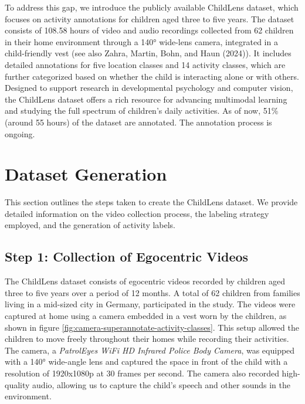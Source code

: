 \documentclass[
  man,floatsintext]{apa6}
\begin{document}
To address this gap, we introduce the publicly available ChildLens dataset, which focuses on activity annotations for children aged three to five years. The dataset consists of 108.58 hours of video and audio recordings collected from 62 children in their home environment through a 140° wide-lens camera, integrated in a child-friendly vest (see also Zahra, Martin, Bohn, and Haun (2024)). It includes detailed annotations for five location classes and 14 activity classes, which are further categorized based on whether the child is interacting alone or with others. Designed to support research in developmental psychology and computer vision, the ChildLens dataset offers a rich resource for advancing multimodal learning and studying the full spectrum of children's daily activities. As of now, 51\% (around 55 hours) of the dataset are annotated. The annotation process is ongoing.

\section{Dataset Generation}\label{dataset-generation}

This section outlines the steps taken to create the ChildLens dataset. We provide detailed information on the video collection process, the labeling strategy employed, and the generation of activity labels.

\subsection{Step 1: Collection of Egocentric Videos}\label{step-1-collection-of-egocentric-videos}

The ChildLens dataset consists of egocentric videos recorded by children aged three to five years over a period of 12 months. A total of 62 children from families living in a mid-sized city in Germany, participated in the study. The videos were captured at home using a camera embedded in a vest worn by the children, as shown in figure \ref{fig:camera-superannotate-activity-classes}. This setup allowed the children to move freely throughout their homes while recording their activities. The camera, a \emph{PatrolEyes WiFi HD Infrared Police Body Camera}, was equipped with a 140° wide-angle lens and captured the space in front of the child with a resolution of 1920x1080p at 30 frames per second. The camera also recorded high-quality audio, allowing us to capture the child's speech and other sounds in the environment.
\end{document}
